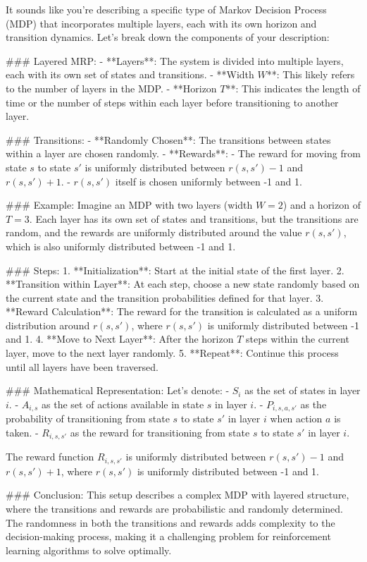 It sounds like you're describing a specific type of Markov Decision Process (MDP) that incorporates multiple layers, each with its own horizon and transition dynamics. Let's break down the components of your description:

### Layered MRP:
- **Layers**: The system is divided into multiple layers, each with its own set of states and transitions.
- **Width \( W \)**: This likely refers to the number of layers in the MDP.
- **Horizon \( T \)**: This indicates the length of time or the number of steps within each layer before transitioning to another layer.

### Transitions:
- **Randomly Chosen**: The transitions between states within a layer are chosen randomly.
- **Rewards**:
  - The reward for moving from state \( s \) to state \( s' \) is uniformly distributed between \( r(s, s') - 1 \) and \( r(s, s') + 1 \).
  - \( r(s, s') \) itself is chosen uniformly between -1 and 1.

### Example:
Imagine an MDP with two layers (width \( W = 2 \)) and a horizon of \( T = 3 \). Each layer has its own set of states and transitions, but the transitions are random, and the rewards are uniformly distributed around the value \( r(s, s') \), which is also uniformly distributed between -1 and 1.

### Steps:
1. **Initialization**: Start at the initial state of the first layer.
2. **Transition within Layer**: At each step, choose a new state randomly based on the current state and the transition probabilities defined for that layer.
3. **Reward Calculation**: The reward for the transition is calculated as a uniform distribution around \( r(s, s') \), where \( r(s, s') \) is uniformly distributed between -1 and 1.
4. **Move to Next Layer**: After the horizon \( T \) steps within the current layer, move to the next layer randomly.
5. **Repeat**: Continue this process until all layers have been traversed.

### Mathematical Representation:
Let's denote:
- \( S_i \) as the set of states in layer \( i \).
- \( A_{i, s} \) as the set of actions available in state \( s \) in layer \( i \).
- \( P_{i, s, a, s'} \) as the probability of transitioning from state \( s \) to state \( s' \) in layer \( i \) when action \( a \) is taken.
- \( R_{i, s, s'} \) as the reward for transitioning from state \( s \) to state \( s' \) in layer \( i \).

The reward function \( R_{i, s, s'} \) is uniformly distributed between \( r(s, s') - 1 \) and \( r(s, s') + 1 \), where \( r(s, s') \) is uniformly distributed between -1 and 1.

### Conclusion:
This setup describes a complex MDP with layered structure, where the transitions and rewards are probabilistic and randomly determined. The randomness in both the transitions and rewards adds complexity to the decision-making process, making it a challenging problem for reinforcement learning algorithms to solve optimally.